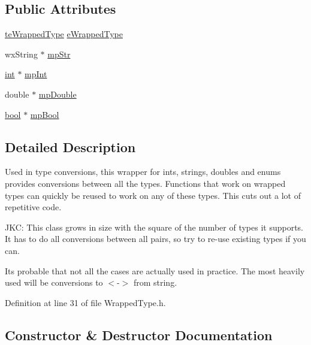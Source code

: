 \subsection*{Public Attributes}
\begin{DoxyCompactItemize}
\item 
\hyperlink{_wrapped_type_8h_adb5fb9dbb644d7cdb83bccc1505cb4d9}{te\+Wrapped\+Type} \hyperlink{class_wrapped_type_a9e669c15eaaaa5dd36d95a4ef67cde8e}{e\+Wrapped\+Type}
\item 
wx\+String $\ast$ \hyperlink{class_wrapped_type_afc8547776eb19d07ec12fe8198fc42bc}{mp\+Str}
\item 
\hyperlink{xmltok_8h_a5a0d4a5641ce434f1d23533f2b2e6653}{int} $\ast$ \hyperlink{class_wrapped_type_ad73dcb462b8a9ec4c23a736e739e9280}{mp\+Int}
\item 
double $\ast$ \hyperlink{class_wrapped_type_a53d8541fff3590f80ea6b8a6ef8d65c0}{mp\+Double}
\item 
\hyperlink{mac_2config_2i386_2lib-src_2libsoxr_2soxr-config_8h_abb452686968e48b67397da5f97445f5b}{bool} $\ast$ \hyperlink{class_wrapped_type_a60eb87bb9b0c426392b7c36a924c49af}{mp\+Bool}
\end{DoxyCompactItemize}


\subsection{Detailed Description}
Used in type conversions, this wrapper for ints, strings, doubles and enums provides conversions between all the types. Functions that work on wrapped types can quickly be reused to work on any of these types. This cuts out a lot of repetitive code. 

J\+KC\+: This class grows in size with the square of the number of types it supports. It has to do all conversions between all pairs, so try to re-\/use existing types if you can.

It\textquotesingle{}s probable that not all the cases are actually used in practice. The most heavily used will be conversions to $<$-\/$>$ from string. 

Definition at line 31 of file Wrapped\+Type.\+h.



\subsection{Constructor \& Destructor Documentation}
